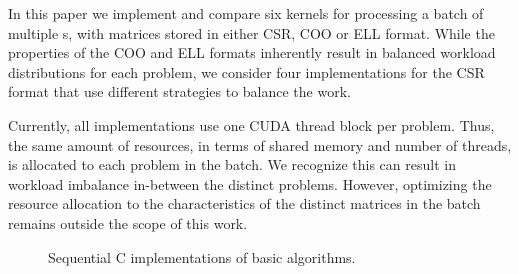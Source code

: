 In this paper we implement and compare six kernels for processing
a batch of multiple {\spmv}s, with matrices stored in either CSR, COO or ELL format.
While the properties of the COO and ELL formats inherently result in
balanced workload distributions for each problem, we consider four implementations
for the CSR format that use different strategies to balance the work.

Currently, all implementations use one CUDA thread block per problem.
Thus, the same amount of resources, in terms of
shared memory and number of threads, is allocated to each problem in the batch.
We recognize this can result in workload imbalance in-between the distinct problems.
However, optimizing the resource allocation to the characteristics of the distinct matrices in the batch remains outside the scope of this work.

\begin{figure*}
\begin{minipage}{\textwidth}

\end{minipage}
\begin{minipage}{\textwidth}

\end{minipage}
\begin{minipage}{\textwidth}

\end{minipage}
\begin{minipage}{\textwidth}

\end{minipage}
\caption{Sequential C implementations of basic \spmv algorithms.}
\label{2017-batched-spmv:fig:spmv}
\end{figure*}

